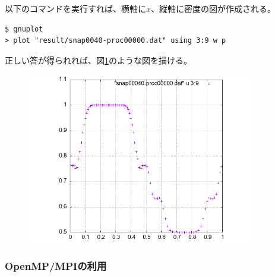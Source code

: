 \documentclass[12pt,a4paper,dvipdfmx]{jarticle}
\begin{document}
以下のコマンドを実行すれば、横軸に$x$、縦軸に密度の図が作成される。

\begin{screen}
\begin{verbatim}
$ gnuplot
> plot "result/snap0040-proc00000.dat" using 3:9 w p
\end{verbatim}
\end{screen}
正しい答が得られれば、図\ref{fig:sph_ftn}のような図を描ける。

\begin{figure}
  \begin{center}
    \includegraphics[width=10cm]{fig/sph_ftn.png}
  \end{center}
  \caption{}
  \label{fig:sph_ftn}
\end{figure}

\subsubsection{OpenMP/MPIの利用}
\end{document}
